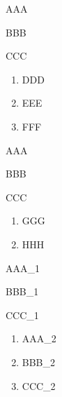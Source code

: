 ﻿\documentclass{article}
\begin{document}
\dotfill

    \begin{enumerate}[label={[\Alph*]},labelindent=\parindent,leftmargin=*] %
        \item AAA
        \item BBB
        \item CCC
    \end{enumerate}

    \begin{enumerate}[resume]
        \item DDD
        \item EEE
        \item FFF
    \end{enumerate}

    \begin{enumerate}[label={[\Alph*]},labelindent=\parindent,leftmargin=*]
        \item AAA
        \item BBB
        \item CCC
    \end{enumerate}

    \begin{enumerate}[resume*]
        \item GGG
        \item HHH
    \end{enumerate}

    \begin{enumerate}[label={[\Alph*]},labelindent=\parindent,leftmargin=*]
        \item AAA\_1
        \item BBB\_1
        \item CCC\_1
    \end{enumerate}

    \begin{enumerate}[resume*,start=1]
        \item AAA\_2
        \item BBB\_2
        \item CCC\_2
    \end{enumerate}
\end{document}
